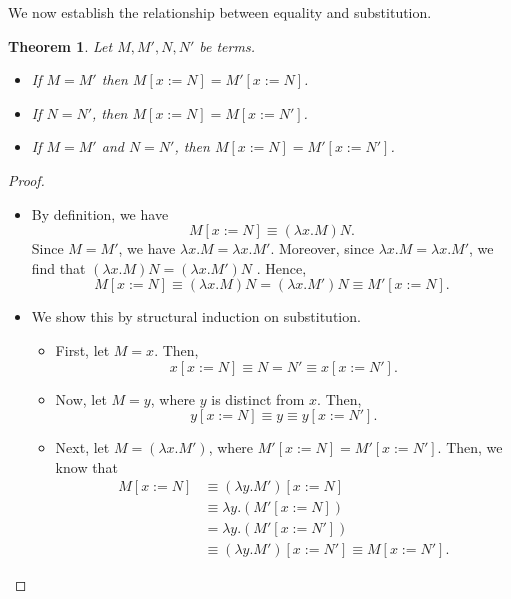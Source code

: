 \documentclass[a4paper, openany]{memoir}
\newtheorem{theorem}[proposition]{Theorem}
\theoremstyle{definition}
\begin{document}
    We now establish the relationship between equality and substitution.
    \begin{theorem}
        Let $M, M', N, N'$ be terms.
        \begin{itemize}
            \item If $M = M'$ then $M[x := N] = M'[x := N]$.
            \item If $N = N'$, then $M[x := N] = M[x := N']$.
            \item If $M = M'$ and $N = N'$, then $M[x := N] = M'[x := N']$.
        \end{itemize}
    \end{theorem}
    \begin{proof}
        \hspace*{0pt}
        \begin{itemize}
            \item By definition, we have
            \[M[x := N] \equiv (\lambda x.M)N.\]
            Since $M = M'$, we have $\lambda x.M = \lambda x.M'$. Moreover, since $\lambda x.M = \lambda x.M'$, we find that $(\lambda x.M)N = (\lambda x.M')N$ . Hence,
            \[M[x := N] \equiv (\lambda x.M)N = (\lambda x.M')N \equiv M'[x := N].\]

            \item We show this by structural induction on substitution.
            \begin{itemize}
                \item First, let $M = x$. Then,
                \[x[x := N] \equiv N = N' \equiv x[x := N'].\]

                \item Now, let $M = y$, where $y$ is distinct from $x$. Then,
                \[y[x := N] \equiv y \equiv y[x := N'].\]

                \item Next, let $M = (\lambda x.M')$, where $M'[x := N] = M'[x := N']$. Then, we know that
                \begin{align*}
                    M[x := N] &\equiv (\lambda y.M')[x := N] \\
                    &\equiv \lambda y.(M'[x := N]) \\
                    &= \lambda y.(M'[x := N']) \\
                    &\equiv (\lambda y.M')[x := N'] \equiv M[x := N'].
                \end{align*}


\end{itemize}
\end{itemize}
\end{proof}
\end{document}
